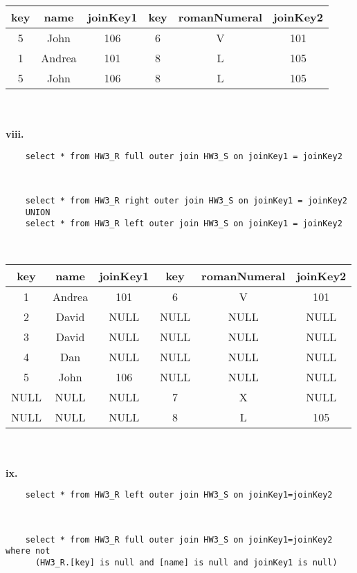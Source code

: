 \documentclass[12pt, letterpaper, fleqn]{article}
\begin{document}
  \begin{tabular}{ c c c c c c }
    key & name & joinKey1 & key & romanNumeral & joinKey2 \\
    \hline 
    5	& John	& 106	& 6&	V	& 101 \\
    1	& Andrea &	101	&8&	L	& 105 \\
    5	& John	& 106	& 8	& L	& 105 
  \end{tabular} \\\\

  \textbf{viii.}\\
  \begin{verbatim}
    select * from HW3_R full outer join HW3_S on joinKey1 = joinKey2
  \end{verbatim}\\
  \begin{verbatim}
    select * from HW3_R right outer join HW3_S on joinKey1 = joinKey2
    UNION
    select * from HW3_R left outer join HW3_S on joinKey1 = joinKey2
  \end{verbatim}\\

  \begin{tabular}{ c c c c c c }
    key & name & joinKey1 & key & romanNumeral & joinKey2 \\
    \hline 
    1	&Andrea	& 101	&6	&V	& 101 \\
    2	& David	& NULL	&NULL	&NULL&	NULL \\ 
    3	& David	& NULL	&NULL	&NULL	& NULL \\
    4	&Dan	& NULL	&NULL	& NULL	&NULL \\
    5	& John	& 106	&NULL	&NULL	& NULL \\
    NULL	& NULL &	NULL &	7	&X	&NULL \\
    NULL & 	NULL& 	NULL&	8	&L	&105 
  \end{tabular} \\\\

  \textbf{ix.}\\
  \begin{verbatim}
    select * from HW3_R left outer join HW3_S on joinKey1=joinKey2
  \end{verbatim}\\
  \begin{verbatim}
    select * from HW3_R full outer join HW3_S on joinKey1=joinKey2 where not
      (HW3_R.[key] is null and [name] is null and joinKey1 is null)
  \end{verbatim}\\
\end{document}
